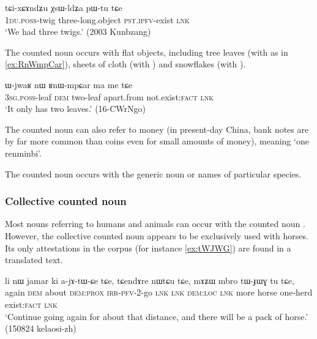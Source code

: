 \begin{exe}
\ex \label{ex:ndZu.XsWldZa}
\gll  tɕi-xɕɤndʑu χsɯ-ldʑa pɯ-tu tɕe \\
\textsc{1du}.\textsc{poss}-twig three-long.object  \textsc{pst}.\textsc{ipfv}-exist \textsc{lnk} \\
\glt `We had three twigs.'  (2003 Kunbzang)
\end{exe}

The counted noun  occurs with flat objects, including tree leaves (with  as in \ref{ex:RnWmpCar}), sheets of cloth (with ) and snowflakes (with ).  

\begin{exe}
\ex \label{ex:RnWmpCar}
\gll ɯ-jwaʁ nɯ ʁnɯ-mpɕar ma me tɕe \\
\textsc{3sg}.\textsc{poss}-leaf \textsc{dem} two-leaf apart.from not.exist:\textsc{fact} \textsc{lnk} \\
\glt `It only has two leaves.'  (16-CWrNgo)
\end{exe}

The counted noun  can also refer to money (in present-day China, bank notes are by far more common than coins even for small amounts of money), meaning `one renminbi'.

The counted noun  occurs with the generic noun  or names of particular species.

\subsubsection{Collective counted noun} \label{sec:collective.counted.noun}
Most nouns referring to humans and animals can occur with the counted noun . However, the collective counted noun  appears to be exclusively used with horses. Its only attestations in the corpus (for instance \ref{ex:tWJWG}) are found in a translated text.

\begin{exe}
\ex \label{ex:tWJWG}
\gll li nɯ jamar ki a-jɤ-tɯ-ɕe tɕe, tɕendɤre nɯtɕu tɕe, mɤʑɯ mbro tɯ-ɟɯɣ tu tɕe,  \\
again \textsc{dem} about \textsc{dem}:\textsc{prox} \textsc{irr}-\textsc{pfv}-2-go \textsc{lnk} \textsc{lnk} \textsc{dem}:\textsc{loc} \textsc{lnk} more horse one-herd exist:\textsc{fact} \textsc{lnk} \\
\glt `Continue going again for about that distance, and there will be a pack of horse.' (150824 kelaosi-zh)
\end{exe}

